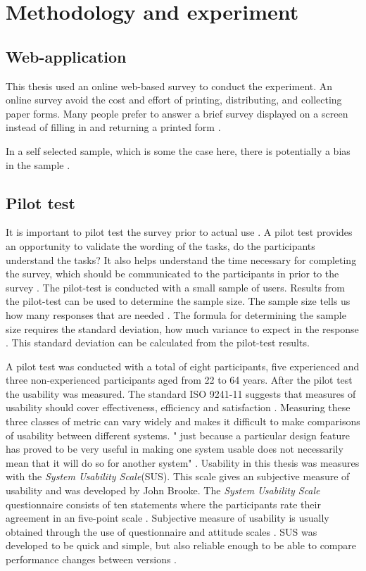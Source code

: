 \chapter{Methodology and experiment}

\section{Web-application}
This thesis used an online web-based survey to conduct the experiment. An online survey avoid the cost and effort of printing, distributing, and collecting paper forms. Many people prefer to answer a brief survey displayed on a screen instead of filling in and returning a printed form \citep{Ben2009}.   

In a self selected sample, which is some the case here, there is potentially a bias in the sample \citep{Ben2009}. %

\section{Pilot test}
It is important to pilot test the survey prior to actual use \citep{Ben2009}. A pilot test provides an opportunity to validate the wording of the tasks, do the participants understand the tasks? It also helps understand the time necessary for completing the survey, which should be communicated to the participants in prior to the survey \citep{Schade2015}. The pilot-test is conducted with a small sample of users. Results from the pilot-test can be used to determine the sample size. The sample size tells us how many responses that are needed \citep{Smith2013}. The formula for determining the sample size requires the standard deviation, how much variance to expect in the response \citep{Smith2013}. This standard deviation can be calculated from the pilot-test results.

A pilot test was conducted with a total of eight participants, five experienced and three non-experienced participants aged from 22 to 64 years. After the pilot test the usability was measured. The standard ISO 9241-11 suggests that measures of usability should cover effectiveness, efficiency and satisfaction \citep{ISO1998}. Measuring these three classes of metric can vary widely and makes it difficult to make comparisons of usability between different systems. " just because a particular design feature has proved to be very useful in making one system usable does not necessarily mean that it will do so for another system" \citep{Brooke1996}. Usability in this thesis was measures with the \textit{System Usability Scale}(SUS). This scale gives an subjective measure of usability and was developed by John Brooke. The \textit{System Usability Scale} questionnaire consists of ten statements where the participants rate their agreement in an five-point scale \citep{Ben2009}. Subjective measure of usability is usually obtained through the use of questionnaire and attitude scales \citep{Brooke1996}. SUS was developed to be quick and simple, but also reliable enough to be able to compare performance changes between versions \citep{Brooke1996}.  

